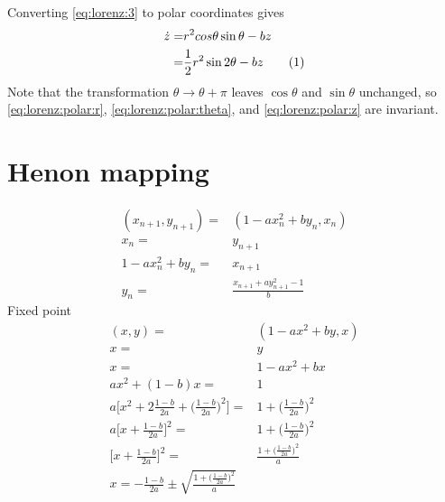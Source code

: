 \documentclass[]{article}
\newcommand\numberthis{\addtocounter{equation}{1}\tag{\theequation}}
\begin{document}
Converting \eqref{eq:lorenz:3} to polar coordinates gives
\begin{align*}
	\dot{z} =& r^2 cos\theta \sin\theta - b z\\
	=& \frac{1}{2} r^2 \sin 2\theta -bz \numberthis \label{eq:lorenz:polar:z}
\end{align*}
Note that the transformation $\theta \rightarrow \theta + \pi$ leaves $\cos \theta$ and $\sin \theta$ unchanged, so \eqref{eq:lorenz:polar:r}, \eqref{eq:lorenz:polar:theta}, and \eqref{eq:lorenz:polar:z} are invariant.

\section{Henon mapping}
\begin{align*}
	(x_{n+1},y_{n+1}) =& (1-ax_n^2+by_n,x_n)\\
	x_n =& y_{n+1}\\
	1-ax_n^2+by_n =& x_{n+1}\\
	y_n =& \frac{x_{n+1} + a  y_{n+1}^2-1}{b}
\end{align*}
Fixed point
\begin{align*}
	(x,y) =& (1-ax^2+by,x)\\
	x =& y\\
	x =& 1-ax^2 +bx\\
	ax^2 + (1-b)x = &1\\
	a\big[x^2 + 2\frac{1-b}{2a} + \big(\frac{1-b}{2a}\big)^2\big]  = &1+ \big(\frac{1-b}{2a}\big)^2\\
	a\big[x+ \frac{1-b}{2a}\big]^2= &1+ \big(\frac{1-b}{2a}\big)^2
	\\
	\big[x+ \frac{1-b}{2a}\big]^2= &\frac{1+ \big(\frac{1-b}{2a}\big)^2}{a}\\
	x = - \frac{1-b}{2a} \pm \sqrt{\frac{1+ \big(\frac{1-b}{2a}\big)^2}{a}}
\end{align*}


\end{document}

